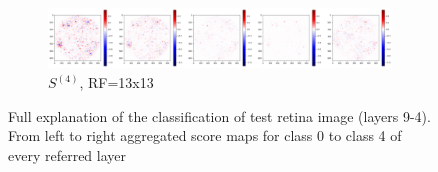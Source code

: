 \documentclass[preprint]{elsarticle}
\theoremstyle{definition} %
\theoremstyle{remark}
\begin{document}
\begin{figure}[h!]
	\begin{subfigure}[b]{\textwidth}
		\includegraphics[width=\textwidth]{figures/score_prop_23713_left/score_rf13.png}
		\caption{$S^{(4)}$, RF=13x13}
		\label{fig:score_rf13}
	\end{subfigure}
	
	\caption{Full explanation of the classification of test retina image (layers 9-4). From left to right aggregated score maps for class 0 to class 4 of every referred layer}
	\label{fig:test1_score_explanation2_rf}
\end{figure}
\end{document}

